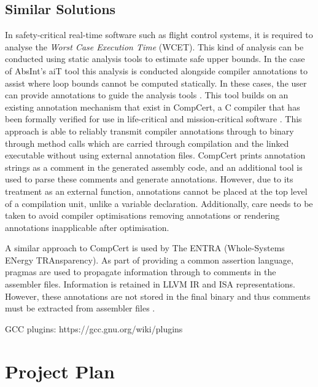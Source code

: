 \documentclass[twocolumn]{article}
\begin{document}
\subsection{Similar Solutions}
In safety-critical real-time software such as flight control systems, it is required to analyse the \textit{Worst Case Execution Time} (WCET). This kind of analysis can be conducted using static analysis tools to estimate safe upper bounds. In the case of AbsInt's aiT tool this analysis is conducted alongside compiler annotations to assist where loop bounds cannot be computed statically. In these cases, the user can provide annotations to guide the analysis tools \cite{schommer2018embedded}. This tool builds on an existing annotation mechanism that exist in CompCert, a C compiler that has been formally verified for use in life-critical and mission-critical software \cite{compcert}. This approach is able to reliably transmit compiler annotations through to binary through method calls which are carried through compilation and the linked executable without using external annotation files. CompCert prints annotation strings as a comment in the generated assembly code, and an additional tool is used to parse these comments and generate annotations. However, due to its treatment as an external function, annotations cannot be placed at the top level of a compilation unit, unlike a variable declaration. Additionally, care needs to be taken to avoid compiler optimisations removing annotations or rendering annotations inapplicable after optimisation.

A similar approach to CompCert is used by The ENTRA (Whole-Systems ENergy TRAnsparency). As part of providing a common assertion language, pragmas are used to propagate information through to comments in the assembler files. Information is retained in LLVM IR and ISA representations. However, these annotations are not stored in the final binary and thus comments must be extracted from assembler files \cite{eder2013common}. 


GCC plugins: https://gcc.gnu.org/wiki/plugins

\section{Project Plan}






\printbibliography
\end{document}
